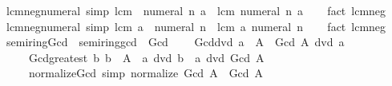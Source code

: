 \begin{isabellebody}
\endisatagproof
{\isafoldproof}%
%
\isadelimproof
\isanewline
%
\endisadelimproof
\isanewline
{}\isamarkupfalse%
\ lcm{\isacharunderscore}{\kern0pt}neg{\isacharunderscore}{\kern0pt}numeral{\isacharunderscore}{\kern0pt}{}\ {\isacharbrackleft}{\kern0pt}simp{\isacharbrackright}{\kern0pt}{\isacharcolon}{\kern0pt}\ {\isachardoublequoteopen}lcm\ {\isacharparenleft}{\kern0pt}{\isacharminus}{\kern0pt}\ numeral\ n{\isacharparenright}{\kern0pt}\ a\ {\isacharequal}{\kern0pt}\ lcm\ {\isacharparenleft}{\kern0pt}numeral\ n{\isacharparenright}{\kern0pt}\ a{\isachardoublequoteclose}\isanewline
%
\isadelimproof
\ \ %
\endisadelimproof
%
\isatagproof
{}\isamarkupfalse%
\ {\isacharparenleft}{\kern0pt}fact\ lcm{\isacharunderscore}{\kern0pt}neg{}{\isacharparenright}{\kern0pt}%
\endisatagproof
{\isafoldproof}%
%
\isadelimproof
\isanewline
%
\endisadelimproof
\isanewline
{}\isamarkupfalse%
\ lcm{\isacharunderscore}{\kern0pt}neg{\isacharunderscore}{\kern0pt}numeral{\isacharunderscore}{\kern0pt}{}\ {\isacharbrackleft}{\kern0pt}simp{\isacharbrackright}{\kern0pt}{\isacharcolon}{\kern0pt}\ {\isachardoublequoteopen}lcm\ a\ {\isacharparenleft}{\kern0pt}{\isacharminus}{\kern0pt}\ numeral\ n{\isacharparenright}{\kern0pt}\ {\isacharequal}{\kern0pt}\ lcm\ a\ {\isacharparenleft}{\kern0pt}numeral\ n{\isacharparenright}{\kern0pt}{\isachardoublequoteclose}\isanewline
%
\isadelimproof
\ \ %
\endisadelimproof
%
\isatagproof
{}\isamarkupfalse%
\ {\isacharparenleft}{\kern0pt}fact\ lcm{\isacharunderscore}{\kern0pt}neg{}{\isacharparenright}{\kern0pt}%
\endisatagproof
{\isafoldproof}%
%
\isadelimproof
\isanewline
%
\endisadelimproof
\isanewline
{}\isamarkupfalse%
\isanewline
\isanewline
{}\isamarkupfalse%
\ semiring{\isacharunderscore}{\kern0pt}Gcd\ {\isacharequal}{\kern0pt}\ semiring{\isacharunderscore}{\kern0pt}gcd\ {\isacharplus}{\kern0pt}\ Gcd\ {\isacharplus}{\kern0pt}\isanewline
\ \ \ Gcd{\isacharunderscore}{\kern0pt}dvd{\isacharcolon}{\kern0pt}\ {\isachardoublequoteopen}a\ {\isasymin}\ A\ {\isasymLongrightarrow}\ Gcd\ A\ dvd\ a{\isachardoublequoteclose}\isanewline
\ \ \ \ \ Gcd{\isacharunderscore}{\kern0pt}greatest{\isacharcolon}{\kern0pt}\ {\isachardoublequoteopen}{\isacharparenleft}{\kern0pt}{\isasymAnd}b{\isachardot}{\kern0pt}\ b\ {\isasymin}\ A\ {\isasymLongrightarrow}\ a\ dvd\ b{\isacharparenright}{\kern0pt}\ {\isasymLongrightarrow}\ a\ dvd\ Gcd\ A{\isachardoublequoteclose}\isanewline
\ \ \ \ \ normalize{\isacharunderscore}{\kern0pt}Gcd\ {\isacharbrackleft}{\kern0pt}simp{\isacharbrackright}{\kern0pt}{\isacharcolon}{\kern0pt}\ {\isachardoublequoteopen}normalize\ {\isacharparenleft}{\kern0pt}Gcd\ A{\isacharparenright}{\kern0pt}\ {\isacharequal}{\kern0pt}\ Gcd\ A{\isachardoublequoteclose}\isanewline

\end{isabellebody}
